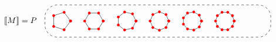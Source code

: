 \begin{equation*}
	\index{every!node}
	\index{every!cancelling every}
	\index{polar coordinates}
	\index{foreach}
	\index{path!cycle}
    \begin{tikzpicture}
        \tikzset{
            vertex/.style={draw,fill,circle,outer sep=0pt,inner sep=0,minimum size=3}
        }
        \begin{scope}[every node/.style={vertex, red}]
            \begin{scope}[xshift=-50, every node/.style={}]
                \node {$\llbracket M \rrbracket = P$};
            \end{scope}
            \draw[dashed,rounded corners=15] (-0.7,0.7) rectangle (9,-0.7);
            \begin{scope}
                \draw (0:0.4) node {}
                \foreach \x in {1,...,5} {
                    -- (\x*360/5:0.4) node {}
                } -- cycle;
            \end{scope}
            \begin{scope}[xshift=40]
                \draw (0:0.4) node {}
                \foreach \x in {1,...,6} {
                    -- (\x*360/6:0.4) node {}
                } -- cycle;
            \end{scope}
            \begin{scope}[xshift=80]
                \draw (0:0.4) node {}
                \foreach \x in {1,...,7} {
                    -- (\x*360/7:0.4) node {}
                } -- cycle;
            \end{scope}
            \begin{scope}[xshift=120]
                \draw (0:0.4) node {}
                \foreach \x in {1,...,8} {
                    -- (\x*360/8:0.4) node {}
                } -- cycle;
            \end{scope}
            \begin{scope}[xshift=160]
                \draw (0:0.4) node {}
                \foreach \x in {1,...,9} {
                    -- (\x*360/9:0.4) node {}
                } -- cycle;
            \end{scope}
            \begin{scope}[xshift=200]
                \draw (0:0.4) node {}
                \foreach \x in {1,...,10} {
                    -- (\x*360/10:0.4) node {}
                } -- cycle;
            \end{scope}
            \begin{scope}[xshift=240, every node/.style={}]

\end{scope}
\end{scope}
\end{tikzpicture}
\end{equation*}
